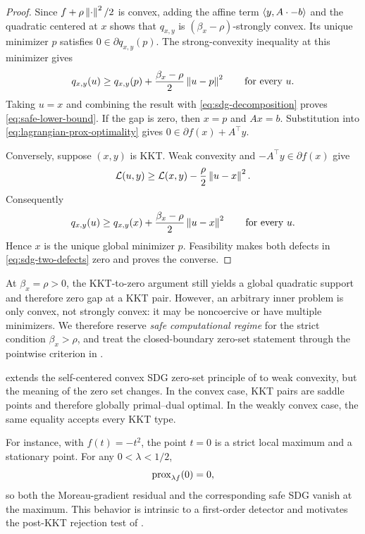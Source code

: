 \begin{proof}
  Since \(f+\rho\left\lVert \cdot\right\rVert^{2}/2\) is convex, adding the affine term
  \(\left\langle y,A\cdot-b\right\rangle\) and the quadratic centered at \(x\) shows that
  \(q_{x,y}\) is \((\beta_x-\rho)\)-strongly convex.  Its unique minimizer
  \(p\) satisfies \(0\in\partial q_{x,y}(p)\).  The strong-convexity
  inequality at this minimizer gives
  \[
    q_{x,y}(u)
    \ge q_{x,y}(p)
       +\frac{\beta_x-\rho}{2}\left\lVert u-p\right\rVert^2
    \qquad\text{for every }u.
  \]
  Taking \(u=x\) and combining the result with
  \cref{eq:sdg-decomposition} proves
  \cref{eq:safe-lower-bound}.  If the gap is zero, then \(x=p\) and
  \(Ax=b\).  Substitution into \cref{eq:lagrangian-prox-optimality} gives
  \(0\in\partial f(x)+A^\top y\).

  Conversely, suppose \((x,y)\) is KKT.  Weak convexity and
  \(-A^\top y\in\partial f(x)\) give
  \[
    \mathcal{L}(u,y)
    \ge \mathcal{L}(x,y)-\frac{\rho}{2}\left\lVert u-x\right\rVert^2.
  \]
  Consequently
  \[
    q_{x,y}(u)
    \ge q_{x,y}(x)
       +\frac{\beta_x-\rho}{2}\left\lVert u-x\right\rVert^2
    \qquad\text{for every }u.
  \]
  Hence \(x\) is the unique global minimizer \(p\).  Feasibility makes both
  defects in \cref{eq:sdg-two-defects} zero and proves the converse.
\end{proof}

\begin{remark}
  At \(\beta_x=\rho>0\), the KKT-to-zero argument still yields a global
  quadratic support and therefore zero gap at a KKT pair.  However, an
  arbitrary inner problem is only convex, not strongly convex: it may be
  noncoercive or have multiple minimizers.  We therefore reserve
  \emph{safe computational regime} for the strict condition
  \(\beta_x>\rho\), and treat the closed-boundary zero-set statement through
  the pointwise criterion in .
\end{remark}

 extends the self-centered convex SDG zero-set
principle of \citet{Fercoq2023,WalwilFercoq2025} to weak convexity, but the
meaning of the zero set changes.
In the convex case, KKT pairs are saddle points and therefore globally
primal--dual optimal.  In the weakly convex case, the same equality accepts
every KKT type.

For instance, with \(f(t)=-t^2\), the point \(t=0\) is a strict local maximum
and a stationary point.  For any \(0<\lambda<1/2\),
\[
  \operatorname{prox}_{\lambda f}(0)=0,
\]
so both the Moreau-gradient residual and the corresponding safe SDG vanish at
the maximum.  This behavior is intrinsic to a first-order detector and
motivates the post-KKT rejection test of .

